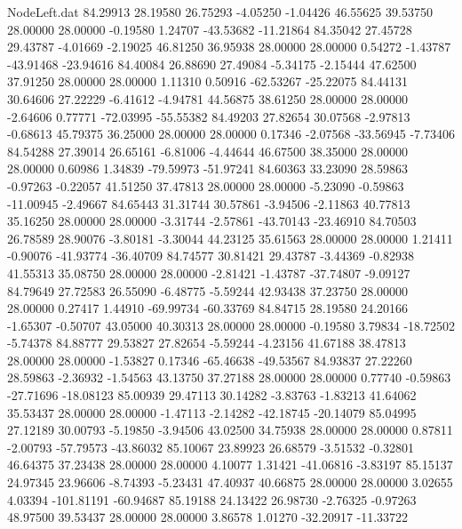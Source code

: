 \begin{filecontents}{NodeLeft.dat}
  84.29913   28.19580   26.75293    -4.05250   -1.04426   46.55625   39.53750   28.00000   28.00000   -0.19580    1.24707  -43.53682  -11.21864
  84.35042   27.45728   29.43787    -4.01669   -2.19025   46.81250   36.95938   28.00000   28.00000    0.54272   -1.43787  -43.91468  -23.94616
  84.40084   26.88690   27.49084    -5.34175   -2.15444   47.62500   37.91250   28.00000   28.00000    1.11310    0.50916  -62.53267  -25.22075
  84.44131   30.64606   27.22229    -6.41612   -4.94781   44.56875   38.61250   28.00000   28.00000   -2.64606    0.77771  -72.03995  -55.55382
  84.49203   27.82654   30.07568    -2.97813   -0.68613   45.79375   36.25000   28.00000   28.00000    0.17346   -2.07568  -33.56945   -7.73406
  84.54288   27.39014   26.65161    -6.81006   -4.44644   46.67500   38.35000   28.00000   28.00000    0.60986    1.34839  -79.59973  -51.97241
  84.60363   33.23090   28.59863    -0.97263   -0.22057   41.51250   37.47813   28.00000   28.00000   -5.23090   -0.59863  -11.00945   -2.49667
  84.65443   31.31744   30.57861    -3.94506   -2.11863   40.77813   35.16250   28.00000   28.00000   -3.31744   -2.57861  -43.70143  -23.46910
  84.70503   26.78589   28.90076    -3.80181   -3.30044   44.23125   35.61563   28.00000   28.00000    1.21411   -0.90076  -41.93774  -36.40709
  84.74577   30.81421   29.43787    -3.44369   -0.82938   41.55313   35.08750   28.00000   28.00000   -2.81421   -1.43787  -37.74807   -9.09127
  84.79649   27.72583   26.55090    -6.48775   -5.59244   42.93438   37.23750   28.00000   28.00000    0.27417    1.44910  -69.99734  -60.33769
  84.84715   28.19580   24.20166    -1.65307   -0.50707   43.05000   40.30313   28.00000   28.00000   -0.19580    3.79834  -18.72502   -5.74378
  84.88777   29.53827   27.82654    -5.59244   -4.23156   41.67188   38.47813   28.00000   28.00000   -1.53827    0.17346  -65.46638  -49.53567
  84.93837   27.22260   28.59863    -2.36932   -1.54563   43.13750   37.27188   28.00000   28.00000    0.77740   -0.59863  -27.71696  -18.08123
  85.00939   29.47113   30.14282    -3.83763   -1.83213   41.64062   35.53437   28.00000   28.00000   -1.47113   -2.14282  -42.18745  -20.14079
  85.04995   27.12189   30.00793    -5.19850   -3.94506   43.02500   34.75938   28.00000   28.00000    0.87811   -2.00793  -57.79573  -43.86032
  85.10067   23.89923   26.68579    -3.51532   -0.32801   46.64375   37.23438   28.00000   28.00000    4.10077    1.31421  -41.06816   -3.83197
  85.15137   24.97345   23.96606    -8.74393   -5.23431   47.40937   40.66875   28.00000   28.00000    3.02655    4.03394 -101.81191  -60.94687
  85.19188   24.13422   26.98730    -2.76325   -0.97263   48.97500   39.53437   28.00000   28.00000    3.86578    1.01270  -32.20917  -11.33722

\end{filecontents}
